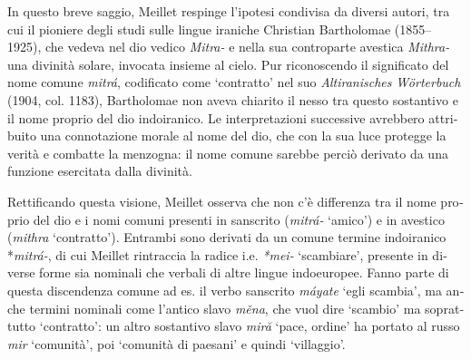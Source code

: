 \documentclass[french,output=paper,colorlinks,citecolor=brown]{../langscibook}
\begin{document}
\begin{otherlanguage}{italian}
In questo breve saggio, Meillet respinge l’ipotesi condivisa da diversi autori, tra cui il pioniere degli studi sulle lingue iraniche Christian Bartholomae (1855--1925), che vedeva nel dio vedico \textit{Mitra-} e nella sua controparte avestica \textit{Mithra-} una divinità solare, invocata insieme al cielo.\textbf{ }Pur riconoscendo il significato del nome comune \textit{mitrá}, codificato come ‘contratto’ nel suo \textit{Altiranisches} \textit{Wörterbuch} (1904, col. 1183), Bartholomae non aveva chiarito il nesso tra questo sostantivo e il nome proprio del dio indoiranico. Le interpretazioni successive avrebbero attribuito una connotazione morale al nome del dio, che con la sua luce protegge la verità e combatte la menzogna: il nome comune sarebbe perciò derivato da una funzione esercitata dalla divinità.\footnotemark{}

Rettificando questa visione, Meillet osserva che non c’è differenza tra il nome proprio del dio e i nomi comuni presenti in sanscrito (\textit{mitrá{}-} ‘amico’) e in avestico (\textit{mithra} ‘contratto’). Entrambi sono derivati da un comune termine indoiranico *\textit{mitrá-}, di cui Meillet rintraccia la radice i.e. \textit{*mei-} ‘scambiare’, presente in diverse forme sia nominali che verbali di altre lingue indoeuropee.\footnotemark{} Fanno parte di questa discendenza comune ad es. il verbo sanscrito \textit{máyate} ‘egli scambia’, ma anche termini nominali come l’antico slavo \textit{měna}, che vuol dire ‘scambio’ ma soprattutto ‘contratto’: un altro sostantivo slavo \textit{miră} ‘pace, ordine’ ha portato al russo \textit{mir} ‘comunità’, poi ‘comunità di paesani’ e quindi ‘villaggio’.



\end{otherlanguage}
\end{document}
